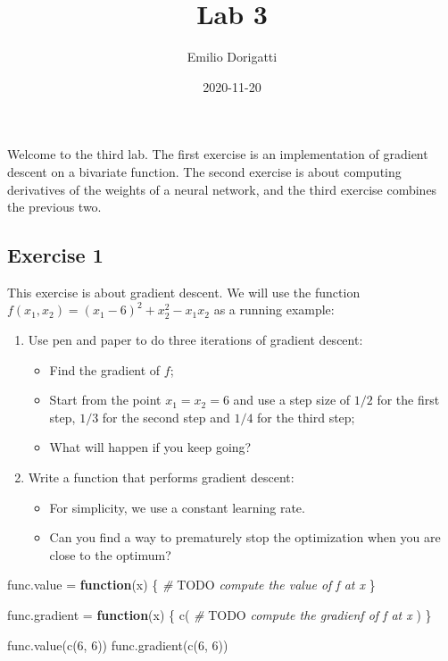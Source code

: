 \documentclass[
  a4paper,
]{article}
\title{Lab 3}
\author{Emilio Dorigatti}
\date{2020-11-20}
\newenvironment{Shaded}{\begin{snugshade}}{\end{snugshade}}
\newcommand{\AlertTok}[1]{\textcolor[rgb]{0.94,0.16,0.16}{#1}}
\newcommand{\CommentTok}[1]{\textcolor[rgb]{0.56,0.35,0.01}{\textit{#1}}}
\newcommand{\ControlFlowTok}[1]{\textcolor[rgb]{0.13,0.29,0.53}{\textbf{#1}}}
\newcommand{\DecValTok}[1]{\textcolor[rgb]{0.00,0.00,0.81}{#1}}
\newcommand{\FunctionTok}[1]{\textcolor[rgb]{0.00,0.00,0.00}{#1}}
\newcommand{\NormalTok}[1]{#1}
\newcommand{\OtherTok}[1]{\textcolor[rgb]{0.56,0.35,0.01}{#1}}
\providecommand{\tightlist}{%
  \setlength{\itemsep}{0pt}\setlength{\parskip}{0pt}}
\begin{document}
\maketitle

Welcome to the third lab. The first exercise is an implementation of
gradient descent on a bivariate function. The second exercise is about
computing derivatives of the weights of a neural network, and the third
exercise combines the previous two.

\hypertarget{exercise-1}{%
\subsection{Exercise 1}\label{exercise-1}}

This exercise is about gradient descent. We will use the function
\(f(x_1, x_2)=(x_1-6)^2+x_2^2-x_1x_2\) as a running example:

\begin{enumerate}
\def\labelenumi{\arabic{enumi}.}
\tightlist
\item
  Use pen and paper to do three iterations of gradient descent:

  \begin{itemize}
  \tightlist
  \item
    Find the gradient of \(f\);
  \item
    Start from the point \(x_1=x_2=6\) and use a step size of \(1/2\)
    for the first step, \(1/3\) for the second step and \(1/4\) for the
    third step;
  \item
    What will happen if you keep going?
  \end{itemize}
\item
  Write a function that performs gradient descent:

  \begin{itemize}
  \tightlist
  \item
    For simplicity, we use a constant learning rate.
  \item
    Can you find a way to prematurely stop the optimization when you are
    close to the optimum?
  \end{itemize}
\end{enumerate}

\begin{Shaded}
\begin{Highlighting}[]
\NormalTok{func.value }\OtherTok{=} \ControlFlowTok{function}\NormalTok{(x) \{}
  \CommentTok{\# }\AlertTok{TODO}\CommentTok{ compute the value of f at x}
\NormalTok{\}}

\NormalTok{func.gradient }\OtherTok{=} \ControlFlowTok{function}\NormalTok{(x) \{}
  \FunctionTok{c}\NormalTok{(}
    \CommentTok{\# }\AlertTok{TODO}\CommentTok{ compute the gradienf of f at x}
\NormalTok{  )}
\NormalTok{\}}

\FunctionTok{func.value}\NormalTok{(}\FunctionTok{c}\NormalTok{(}\DecValTok{6}\NormalTok{, }\DecValTok{6}\NormalTok{))}
\FunctionTok{func.gradient}\NormalTok{(}\FunctionTok{c}\NormalTok{(}\DecValTok{6}\NormalTok{, }\DecValTok{6}\NormalTok{))}
\end{Highlighting}
\end{Shaded}
\end{document}
